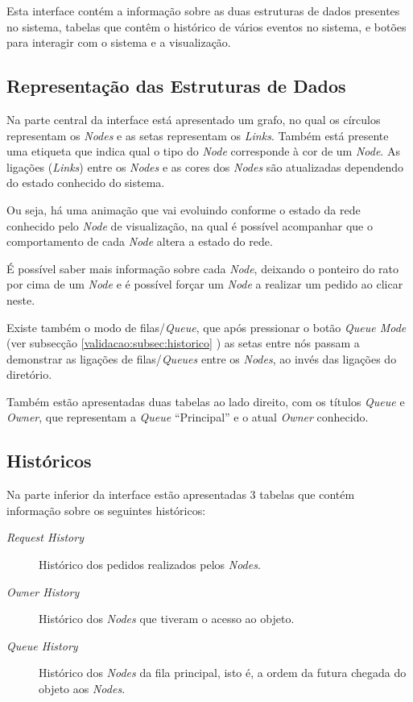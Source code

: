 Esta interface contém a informação sobre as duas estruturas de dados presentes no sistema, tabelas que contêm o histórico de vários eventos no sistema, e botões para interagir com o sistema e a visualização.


\subsection*{Representação das Estruturas de Dados}
Na parte central da interface está apresentado um grafo, no qual os círculos representam os \emph{Nodes} e as setas representam os \emph{Links}. 
Também está presente uma etiqueta que indica qual o tipo do \emph{Node} corresponde à cor de um \emph{Node}.
As ligações (\emph{Links}) entre os \emph{Nodes} e as cores dos \emph{Nodes} são atualizadas dependendo do estado conhecido do sistema. 

Ou seja, há uma animação que vai evoluindo conforme o estado da rede conhecido pelo \emph{Node} de visualização, na qual é possível acompanhar que o comportamento de cada \emph{Node} altera a estado do rede.

É possível saber mais informação sobre cada \emph{Node}, deixando o ponteiro do rato por cima de um \emph{Node} e é possível forçar um \emph{Node} a realizar um pedido ao clicar neste.

Existe também o modo de filas/\emph{Queue}, que após pressionar o botão \emph{Queue Mode} (ver subsecção \ref{validacao:subsec:historico}
) as setas entre nós passam a demonstrar as ligações de filas/\emph{Queues} entre os \emph{Nodes}, ao invés das ligações do diretório.

Também estão apresentadas duas tabelas ao lado direito, com os títulos \emph{Queue} e \emph{Owner}, que representam a \emph{Queue} ``Principal'' e o atual \emph{Owner} conhecido.

\subsection*{Históricos}
\label{validacao:subsec:historico}
Na parte inferior da interface estão apresentadas 3 tabelas que contém informação sobre os seguintes históricos:
\begin{description}
    \item [\emph{Request History}] Histórico dos pedidos realizados pelos \emph{Nodes}.
    \item [\emph{Owner History}] Histórico dos \emph{Nodes} que tiveram o acesso ao objeto.
    \item [\emph{Queue History}] Histórico dos \emph{Nodes} da fila principal, isto é, a ordem da futura chegada do objeto aos \emph{Nodes}.
\end{description}

